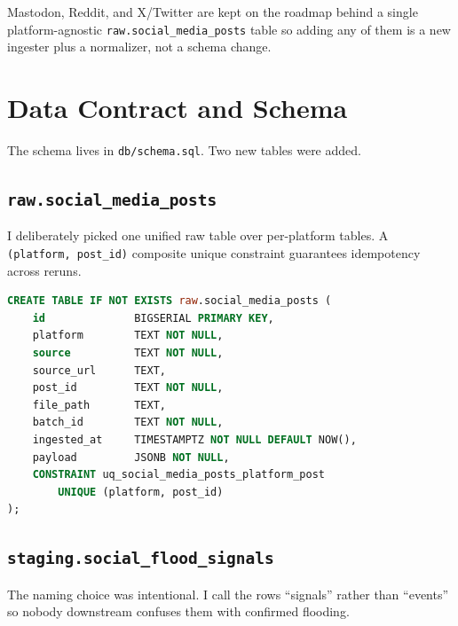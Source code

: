 \documentclass[11pt]{article}
\begin{document}
Mastodon, Reddit, and X/Twitter are kept on the roadmap behind a single
platform-agnostic \texttt{raw.social\_media\_posts} table so adding any
of them is a new ingester plus a normalizer, not a schema change.

\section{Data Contract and Schema}

The schema lives in \texttt{db/schema.sql}. Two new tables were added.

\subsection{\texttt{raw.social\_media\_posts}}

I deliberately picked one unified raw table over per-platform tables. A
\texttt{(platform, post\_id)} composite unique constraint guarantees
idempotency across reruns.

\begin{lstlisting}[language=SQL]
CREATE TABLE IF NOT EXISTS raw.social_media_posts (
    id              BIGSERIAL PRIMARY KEY,
    platform        TEXT NOT NULL,
    source          TEXT NOT NULL,
    source_url      TEXT,
    post_id         TEXT NOT NULL,
    file_path       TEXT,
    batch_id        TEXT NOT NULL,
    ingested_at     TIMESTAMPTZ NOT NULL DEFAULT NOW(),
    payload         JSONB NOT NULL,
    CONSTRAINT uq_social_media_posts_platform_post
        UNIQUE (platform, post_id)
);
\end{lstlisting}

\subsection{\texttt{staging.social\_flood\_signals}}

The naming choice was intentional. I call the rows ``signals'' rather
than ``events'' so nobody downstream confuses them with confirmed
flooding.
\end{document}
